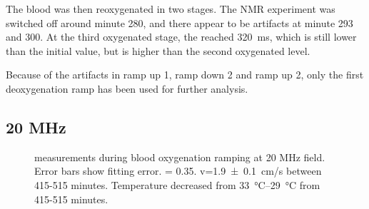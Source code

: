 The blood was then reoxygenated in two stages.
The NMR experiment was switched off around minute 280, and there appear to be artifacts at minute 293 and 300.
At the third oxygenated stage, the \Ttwo reached \SI{320}{ms}, which is still lower than the initial value, but is higher than the second oxygenated level.

Because of the artifacts in ramp up 1, ramp down 2 and ramp up 2, only the first deoxygenation ramp has been used for further analysis.

\subsection{20 MHz}
\begin{figure}[tph]
\centering
{}



\caption[\Ttwo measurements during blood oxygenation ramping at 20 MHz field]{\Ttwo measurements during blood oxygenation ramping at 20 MHz field. Error bars show \Ttwo fitting error. \Hct = 0.35. v=\SI{1.9\pm0.1}{cm/s} between  415-515 minutes. Temperature decreased from \SIrange{33}{29}{\celsius} from 415-515 minutes.}
\label{fig:contflow-20mhzT2Time}
\end{figure}


